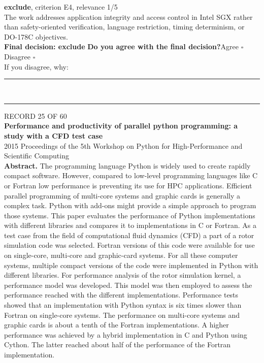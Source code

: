\documentclass[11pt,a4paper]{article}
\begin{document}
{\small\textbf{exclude}, criterion E4, relevance 1/5}\\[0.5mm]
{\small The work addresses application integrity and access control in Intel SGX rather than safety-oriented verification, language restriction, timing determinism, or DO-178C objectives.}\\[2.5mm]
{\small\textbf{Final decision: exclude}}
\vspace{2mm}
{\small\textbf{Do you agree with the final decision?}\quad{}Agree $\square$\qquad{}Disagree $\square$}\\[1mm]
{\footnotesize\color{soft}If you disagree, why:}\\[1mm]
\color{rule}\rule{\linewidth}{0.3pt}\\[3mm]\rule{\linewidth}{0.3pt}\color{black}
\clearpage
{\color{soft}\footnotesize RECORD 25 OF 60}\\[1mm]
{\large\bfseries Performance and productivity of parallel python programming: a study with a CFD test case}\\[1.5mm]
{\color{soft}\small 2015 \textperiodcentered{} Proceedings of the 5th Workshop on Python for High-Performance and Scientific Computing}\\[2mm]
{\small\textbf{Abstract.} The programming language Python is widely used to create rapidly compact software. However, compared to low-level programming languages like C or Fortran low performance is preventing its use for HPC applications. Efficient parallel programming of multi-core systems and graphic cards is generally a complex task. Python with add-ons might provide a simple approach to program those systems. This paper evaluates the performance of Python implementations with different libraries and compares it to implementations in C or Fortran. As a test case from the field of computational fluid dynamics (CFD) a part of a rotor simulation code was selected. Fortran versions of this code were available for use on single-core, multi-core and graphic-card systems. For all these computer systems, multiple compact versions of the code were implemented in Python with different libraries. For performance analysis of the rotor simulation kernel, a performance model was developed. This model was then employed to assess the performance reached with the different implementations. Performance tests showed that an implementation with Python syntax is six times slower than Fortran on single-core systems. The performance on multi-core systems and graphic cards is about a tenth of the Fortran implementations. A higher performance was achieved by a hybrid implementation in C and Python using Cython. The latter reached about half of the performance of the Fortran implementation.}
\end{document}
